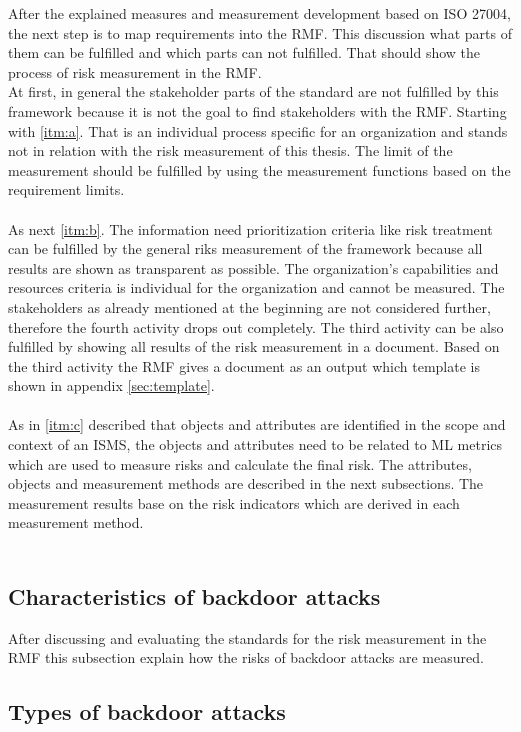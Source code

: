 After the explained measures and measurement development based on ISO 27004, the next step is to map requirements into the RMF. This discussion what parts of them can be fulfilled and which parts can not fulfilled. That should show the process of risk measurement in the RMF. \\
At first, in general the stakeholder parts of the standard are not fulfilled by this framework because it is not the goal to find stakeholders with the RMF. Starting with \ref{itm:a}. That is an individual process specific for an organization and stands not in relation with the risk measurement of this thesis. The limit of the measurement should be fulfilled by using the measurement functions based on the requirement limits. \\ \\
As next \ref{itm:b}. The information need prioritization criteria like risk treatment can be fulfilled by the general riks measurement of the framework because all results are shown as transparent as possible. The organization's capabilities and resources criteria is individual for the organization and cannot be measured. The stakeholders as already mentioned at the beginning are not considered further, therefore the fourth activity drops out completely. The third activity can be also fulfilled by showing all results of the risk measurement in a document. Based on the third activity the RMF gives a document as an output which template is shown in appendix \ref{sec:template}. \\ \\
As in \ref{itm:c} described that objects and attributes are identified in the scope and context of an ISMS, the objects and attributes need to be related to ML metrics which are used to measure risks and calculate the final risk. The attributes, objects and measurement methods are described in the next subsections. The measurement results base on the risk indicators which are derived in each measurement method. \\ \\

\subsection{Characteristics of backdoor attacks}

After discussing and evaluating the standards for the risk measurement in the RMF this subsection explain how the risks of backdoor attacks are measured.

\subsection{Types of backdoor attacks}

